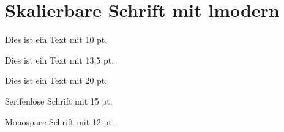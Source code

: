 \documentclass[11pt,a4paper]{scrartcl}
\begin{document}
\section{Skalierbare Schrift mit lmodern}

{\fontsize{10pt}{12pt}\selectfont
Dies ist ein Text mit 10 pt.\par}

\bigskip

{\fontsize{13.5pt}{17pt}\selectfont
Dies ist ein Text mit 13,5 pt.\par}

\bigskip

{\fontsize{20pt}{24pt}\selectfont
Dies ist ein Text mit 20 pt.\par}

\bigskip

{\sffamily\fontsize{15pt}{18pt}\selectfont
Serifenlose Schrift mit 15 pt.\par}

\bigskip

{\ttfamily\fontsize{12pt}{15pt}\selectfont
Monospace-Schrift mit 12 pt.\par}
\end{document}
